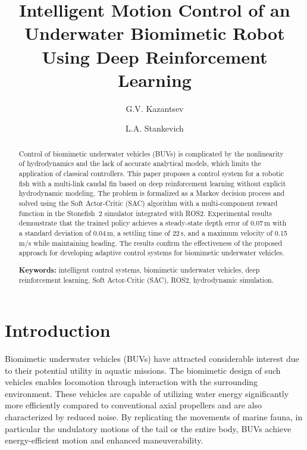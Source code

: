 \documentclass[12pt]{revtex4}
\begin{document}
\title{Intelligent Motion Control of an Underwater Biomimetic Robot
       Using Deep Reinforcement Learning}

\author{G.V. Kazantsev}
\author{L.A. Stankevich}

\begin{abstract}
Control of biomimetic underwater vehicles (BUVs) is complicated
by the nonlinearity of hydrodynamics and the lack of accurate
analytical models, which limits the application of classical
controllers. This paper proposes a control system for a robotic
fish with a multi-link caudal fin based on deep reinforcement
learning without explicit hydrodynamic modeling. The problem is
formalized as a Markov decision process and solved using the
Soft Actor-Critic (SAC) algorithm with a multi-component reward
function in the Stonefish~2 simulator integrated with ROS2.
Experimental results demonstrate that the trained policy achieves
a steady-state depth error of 0.07\,m with a standard deviation
of 0.04\,m, a settling time of 22\,s, and a maximum velocity of
0.15\,m/s while maintaining heading. The results confirm the
effectiveness of the proposed approach for developing adaptive
control systems for biomimetic underwater vehicles.

\medskip
\noindent\textbf{Keywords:} intelligent control systems,
biomimetic underwater vehicles, deep reinforcement learning,
Soft Actor-Critic (SAC), ROS2, hydrodynamic simulation.
\end{abstract}

\maketitle

\section{Introduction}


Biomimetic underwater vehicles (BUVs) have attracted considerable interest due to their potential utility in aquatic missions. The biomimetic design of such vehicles enables locomotion through interaction with the surrounding environment. These vehicles are capable of utilizing water energy significantly more efficiently compared to conventional axial propellers and are also characterized by reduced noise. By replicating the movements of marine fauna, in particular the undulatory motions of the tail or the entire body, BUVs achieve energy-efficient motion and enhanced maneuverability.
\end{document}
